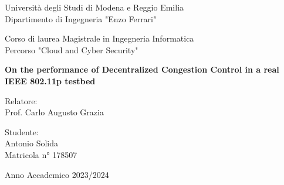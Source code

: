 \thispagestyle{plain}

\begin{titlepage}
    \begin{center}

		Università degli Studi di Modena e Reggio Emilia\\
		\large
		Dipartimento di Ingegneria "Enzo Ferrari"

        \vspace{2.5cm}
        
		\Large
		Corso di laurea Magistrale in Ingegneria Informatica\\
		
		\large
		Percorso "Cloud and Cyber Security"		
		
		\vspace{2.5cm}
        
        \Huge
        \textbf{On the performance of Decentralized Congestion Control in a real IEEE 802.11p testbed}

        \vspace{2cm}

		\Large 
        \begin{flushleft}
        Relatore:\\
        Prof. Carlo Augusto Grazia
        \end{flushleft}
                
        \begin{flushleft}
        \end{flushleft}
        
        \vspace{1cm}
        
        \large
		\begin{flushright}
		Studente:\\
		Antonio Solida\\
        Matricola n° 178507
		\end{flushright}
        
		\vfill
		
		\small
		Anno Accademico 2023/2024
            
    \end{center}
\end{titlepage}